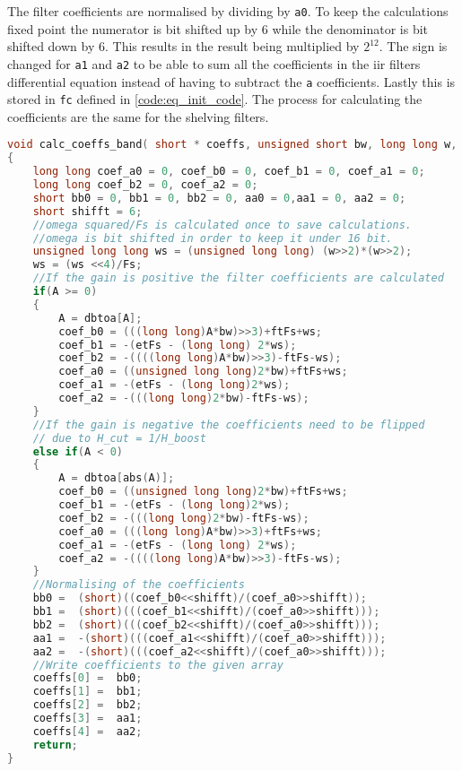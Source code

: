 The filter coefficients are normalised by dividing by \texttt{a0}. To keep the calculations fixed point the numerator is bit shifted up by 6 while the denominator is bit shifted down by 6. This results in the result being multiplied by $2^{12}$. The sign is changed for \texttt{a1} and \texttt{a2} to be able to sum all the coefficients in the \gls{iir} filters differential equation instead of having to subtract the \texttt{a} coefficients.
Lastly this is stored in \texttt{fc} defined in \autoref{code:eq_init_code}. The process for calculating the coefficients are the same for the shelving filters. 
\begin{lstlisting}[caption={Calculating of band pass filter coefficients},language=C,label={code:eq_bp_coef_code},tabsize=2]
void calc_coeffs_band( short * coeffs, unsigned short bw, long long w, short A)
{
	long long coef_a0 = 0, coef_b0 = 0, coef_b1 = 0, coef_a1 = 0;
	long long coef_b2 = 0, coef_a2 = 0;
	short bb0 = 0, bb1 = 0, bb2 = 0, aa0 = 0,aa1 = 0, aa2 = 0;
	short shifft = 6;
	//omega squared/Fs is calculated once to save calculations. 
	//omega is bit shifted in order to keep it under 16 bit.
	unsigned long long ws = (unsigned long long) (w>>2)*(w>>2);
	ws = (ws <<4)/Fs;
	//If the gain is positive the filter coefficients are calculated
	if(A >= 0)
	{
		A = dbtoa[A];
		coef_b0 = (((long long)A*bw)>>3)+ftFs+ws;
		coef_b1 = -(etFs - (long long) 2*ws);
		coef_b2 = -((((long long)A*bw)>>3)-ftFs-ws);
		coef_a0 = ((unsigned long long)2*bw)+ftFs+ws;
		coef_a1 = -(etFs - (long long)2*ws);
		coef_a2 = -(((long long)2*bw)-ftFs-ws);
	}
	//If the gain is negative the coefficients need to be flipped
	// due to H_cut = 1/H_boost
	else if(A < 0)
	{
		A = dbtoa[abs(A)];
		coef_b0 = ((unsigned long long)2*bw)+ftFs+ws;
		coef_b1 = -(etFs - (long long)2*ws);
		coef_b2 = -(((long long)2*bw)-ftFs-ws);
		coef_a0 = (((long long)A*bw)>>3)+ftFs+ws;
		coef_a1 = -(etFs - (long long) 2*ws);
		coef_a2 = -((((long long)A*bw)>>3)-ftFs-ws);
	}
	//Normalising of the coefficients
	bb0 =  (short)((coef_b0<<shifft)/(coef_a0>>shifft));
	bb1 =  (short)(((coef_b1<<shifft)/(coef_a0>>shifft)));
	bb2 =  (short)(((coef_b2<<shifft)/(coef_a0>>shifft)));
	aa1 =  -(short)(((coef_a1<<shifft)/(coef_a0>>shifft)));
	aa2 =  -(short)(((coef_a2<<shifft)/(coef_a0>>shifft)));
	//Write coefficients to the given array
	coeffs[0] =  bb0;
	coeffs[1] =  bb1;
	coeffs[2] =  bb2;
	coeffs[3] =  aa1;
	coeffs[4] =  aa2;
	return;
}
\end{lstlisting}


